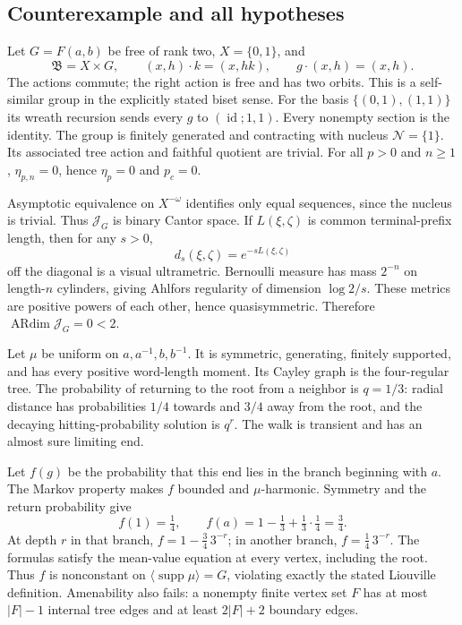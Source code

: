 \documentclass[10pt]{article}
\begin{document}
\subsection*{Counterexample and all hypotheses}
Let \(G=F(a,b)\) be free of rank two, \(X=\{0,1\}\), and \[\mathfrak B=X\times G,\qquad
 (x,h)\cdot k=(x,hk),\qquad g\cdot(x,h)=(x,h).\] The actions commute; the right action is free and has two orbits. This is a self-similar group in the explicitly stated biset sense. For the basis \(\{(0,1),(1,1)\}\) its wreath recursion sends every \(g\) to \((\operatorname{id};1,1)\). Every nonempty section is the identity. The group is finitely generated and contracting with nucleus \(\mathcal N=\{1\}\). Its associated tree action and faithful quotient are trivial. For all \(p>0\) and \(n\ge1\), \(\eta_{p,n}=0\), hence \(\eta_p=0\) and \(p_c=0\).\par
Asymptotic equivalence on \(X^{-\omega}\) identifies only equal sequences, since the nucleus is trivial. Thus \(\mathcal J_G\) is binary Cantor space. If \(L(\xi,\zeta)\) is common terminal-prefix length, then for any \(s>0\), \[d_s(\xi,\zeta)=e^{-sL(\xi,\zeta)}\] off the diagonal is a visual ultrametric. Bernoulli measure has mass \(2^{-n}\) on length-\(n\) cylinders, giving Ahlfors regularity of dimension \(\log2/s\). These metrics are positive powers of each other, hence quasisymmetric. Therefore \(\operatorname{ARdim}\mathcal J_G=0<2\).\par
Let \(\mu\) be uniform on \(a,a^{-1},b,b^{-1}\). It is symmetric, generating, finitely supported, and has every positive word-length moment. Its Cayley graph is the four-regular tree. The probability of returning to the root from a neighbor is \(q=1/3\): radial distance has probabilities \(1/4\) towards and \(3/4\) away from the root, and the decaying hitting-probability solution is \(q^r\). The walk is transient and has an almost sure limiting end.\par
Let \(f(g)\) be the probability that this end lies in the branch beginning with \(a\). The Markov property makes \(f\) bounded and \(\mu\)-harmonic. Symmetry and the return probability give \[f(1)=\tfrac14,\qquad
 f(a)=1-\tfrac13+\tfrac13\cdot\tfrac14=\tfrac34.\] At depth \(r\) in that branch, \(f=1-\frac34\,3^{-r}\); in another branch, \(f=\frac14\,3^{-r}\). The formulas satisfy the mean-value equation at every vertex, including the root. Thus \(f\) is nonconstant on \(\langle\operatorname{supp}\mu\rangle=G\), violating exactly the stated Liouville definition. Amenability also fails: a nonempty finite vertex set \(F\) has at most \(|F|-1\) internal tree edges and at least \(2|F|+2\) boundary edges.\par
\end{document}
